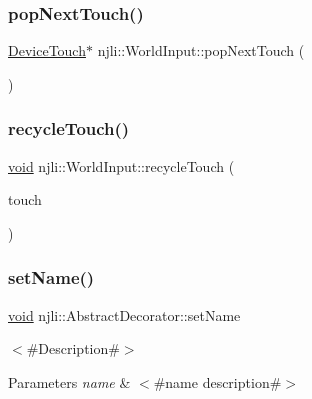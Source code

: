\subsubsection{\texorpdfstring{pop\+Next\+Touch()}{popNextTouch()}}
{\footnotesize\ttfamily \mbox{\hyperlink{classnjli_1_1_device_touch}{Device\+Touch}}$\ast$ njli\+::\+World\+Input\+::pop\+Next\+Touch (\begin{DoxyParamCaption}{ }\end{DoxyParamCaption})\hspace{0.3cm}{\ttfamily [protected]}}

\mbox{\label{classnjli_1_1_world_input_ad60c4859e00c667566906dbaeefd99b0}} 
\subsubsection{\texorpdfstring{recycle\+Touch()}{recycleTouch()}}
{\footnotesize\ttfamily \mbox{\hyperlink{_thread_8h_af1e856da2e658414cb2456cb6f7ebc66}{void}} njli\+::\+World\+Input\+::recycle\+Touch (\begin{DoxyParamCaption}\item[{\mbox{\hyperlink{classnjli_1_1_device_touch}{Device\+Touch}} $\ast$}]{touch }\end{DoxyParamCaption})\hspace{0.3cm}{\ttfamily [protected]}}

\mbox{\label{classnjli_1_1_world_input_a087eb5f8d9f51cc476f12f1d10a3cb95}} 
\subsubsection{\texorpdfstring{set\+Name()}{setName()}}
{\footnotesize\ttfamily \mbox{\hyperlink{_thread_8h_af1e856da2e658414cb2456cb6f7ebc66}{void}} njli\+::\+Abstract\+Decorator\+::set\+Name}

$<$\#\+Description\#$>$


\begin{DoxyParams}{Parameters}
{\em name} & $<$\#name description\#$>$ \\
\hline
\end{DoxyParams}
\mbox{\label{classnjli_1_1_world_input_a453864260fa99d407de3453e3bea109b}} 
